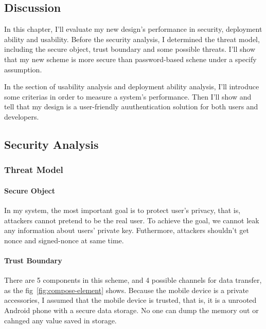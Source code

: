 \begin{CJK}{Bg5}{bsmi}


\chapter{Discussion}

In this chapter, I'll evaluate my new design's performance in security, deployment ability and usability. Before the security analysis, I determined the threat model, including the secure object, trust boundary and some possible threats. I'll show that my new scheme is more secure than password-based schene under a specify assumption.

In the section of usability analysis and deployment ability analysis, I'll introduce some criterias in order to measure a system's performance. Then I'll show and tell that my design is a user-friendly auuthentication solution for both users and developers.

\section{Security Analysis}

\subsection{Threat Model}

\subsubsection{Secure Object}

In my system, the most important goal is to protect user's privacy, that is, attackers cannot pretend to be the real user. To achieve the goal, we cannot leak any information about users' private key. Futhermore, attackers shouldn't get nonce and signed-nonce at same time.

\subsubsection{Trust Boundary}

There are 5 components in this scheme, and 4 possible channels for data transfer, as the fig~\ref{fig:compose-element} shows. Because the mobile device is a private accessories, I assumed that the mobile device is trusted, that is, it is a unrooted Android phone with a secure data storage. No one can dump the memory out or cahnged any value saved in storage. 


\end{CJK}
